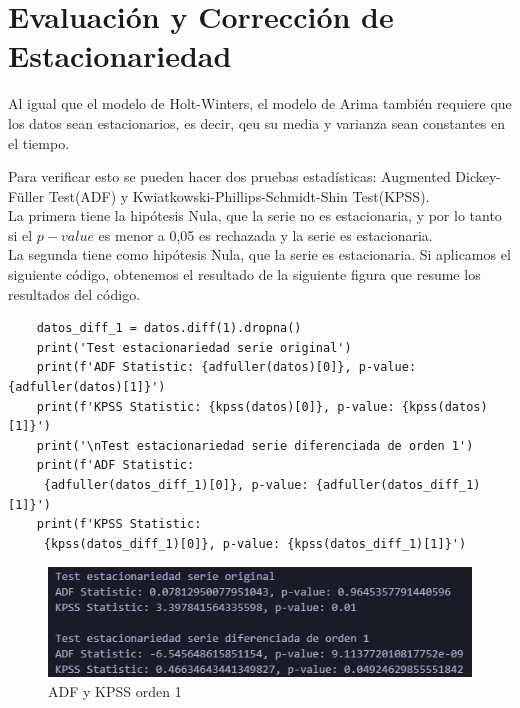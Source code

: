 \section{Evaluación y Corrección de Estacionariedad}

Al igual que el modelo de Holt-Winters, el modelo de Arima también requiere que los datos sean estacionarios, es decir, qeu su media y varianza sean constantes en el tiempo. 

Para verificar esto se pueden hacer dos pruebas estadísticas: Augmented Dickey-Füller Test(ADF) y Kwiatkowski-Phillips-Schmidt-Shin Test(KPSS).\\

La primera tiene la hipótesis Nula, que la serie no es estacionaria, y por lo tanto si el $p-value$ es menor a 0,05 es rechazada y la serie es estacionaria.\\

La segunda tiene como hipótesis Nula, que la serie es estacionaria.
Si aplicamos el siguiente código, obtenemos el resultado de la siguiente figura que resume los resultados del código.\\

\begin{lstlisting}
	datos_diff_1 = datos.diff(1).dropna()
	print('Test estacionariedad serie original')
	print(f'ADF Statistic: {adfuller(datos)[0]}, p-value: {adfuller(datos)[1]}')
	print(f'KPSS Statistic: {kpss(datos)[0]}, p-value: {kpss(datos)[1]}')
	print('\nTest estacionariedad serie diferenciada de orden 1')
	print(f'ADF Statistic:
	 {adfuller(datos_diff_1)[0]}, p-value: {adfuller(datos_diff_1)[1]}')
	print(f'KPSS Statistic:
	 {kpss(datos_diff_1)[0]}, p-value: {kpss(datos_diff_1)[1]}')
\end{lstlisting}


\begin{figure}[h]
	\centering
	\includegraphics[width=0.7\linewidth]{fuller}
	\caption{ADF y KPSS orden 1}
	\label{fig:fuller}
\end{figure}

